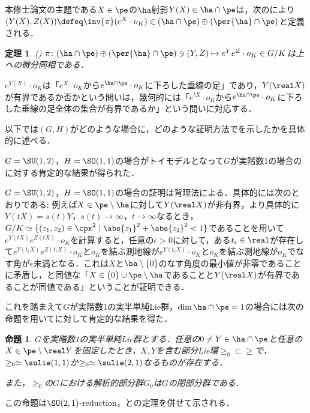 \documentclass[12pt,dvipdfmx,uplatex]{jsarticle}
\newcounter{countabst}
\newtheorem{thm-a}[countabst]{定理}
\newtheorem{prop-a}[countabst]{命題}
\begin{document}
本修士論文の主題である$X\in \pe$の$\ha$射影$Y(X)\in \ha\cap \pe $は，次のにより${(Y(X), Z(X))\defeq \inv{\pi}(e^X\cdot o_K)\in (\ha\cap\pe)\oplus (\per{\ha}\cap \pe)}$と定義される．
\begin{thm-a}(\cite[Lemma~6.1]{kob89}\label{thm:kob89-lem6.1})
  $\pi\colon  (\ha\cap\pe)\oplus (\per{\ha}\cap \pe) \ni (Y, Z)\mapsto e^{Y}e^{Z}\cdot o_K \in G/K $は上への微分同相である．
\end{thm-a}

$e^{Y(X)}\cdot o_K$は「$e^{X}\cdot o_K$から$e^{\ha\cap\pe}\cdot o_K $に下ろした垂線の足」であり，$Y(\real X) $が有界であるか否かという問いは，幾何的には「$e^{tX}\cdot o_K$から$e^{\ha\cap\pe}\cdot o_K $に下ろした垂線の足全体の集合が有界であるか」という問いに対応する．

以下では$(G,H) $がどのような場合に，どのような証明方法でを示したかを具体的に述べる．

$G = \SU(1,2) $，$H= \SO(1,1)$の場合がトイモデルとなって$G$が実階数1の場合のに対する肯定的な結果が得られた．

$G = \SU(1,2) $，$H= \SO(1,1)$の場合の証明は背理法による．具体的には次のとおりである; 例えば$X\in \pe\setminus\ha $に対して$Y(\real X) $が非有界，より具体的に$Y(t X) = s(t) Y$，$s(t) \to \infty$，$t\to \infty $なるとき，$G/K \simeq \{(z_1,z_2)\in \cpx^2 \mid \abs{z_1}^2 + \abs{z_2}^2 < 1 \} $であることを用いて$e^{Y(tX)}e^{Z(tX)}\cdot o_K $を計算すると，任意の$\epsilon > 0$に対して，ある$t_{\epsilon}\in \real$が存在して$ e^{Y(t_{\epsilon} X)}e^{Z(t_{\epsilon} X)}\cdot o_K $と$o_K$を結ぶ測地線が$e^{Y(t_{\epsilon} X)}\cdot o_K $と$o_K$を結ぶ測地線が$o_K$でなす角が$\epsilon $未満となる．これは$X$と$\ha\setminus\{0\} $のなす角度の最小値が非零であることに矛盾し，と同値な「$X\in \{0\}\cup \pe\setminus\ha $であることと$ Y(\real X) $が有界であることが同値である」ということが証明できる．

これを踏まえて$G$が実階数1の実半単純Lie群，$\dim \ha\cap\pe =1 $の場合には次の命題を用いてに対して肯定的な結果を得た．

\begin{prop-a}
  $G$を実階数1の実半単純Lie群とする．任意の$0\neq Y\in \ha\cap\pe $と任意の$X\in \pe\setminus \real Y$を固定したとき，$X,Y$を含む部分Lie環$\ge_0\subset \ge$で，$\ge_0\simeq \sulie(1,1) $か$\ge_0\simeq \sulie(2,1)$なるものが存在する．

  また，$\ge_0$の$G$における解析的部分群$G_0$は$G$の閉部分群である．
\end{prop-a}
この命題は{$\SU(2,1) $-reduction}，\cite{hel01}と\cite{yos38}の定理を併せて示される．
\end{document}
